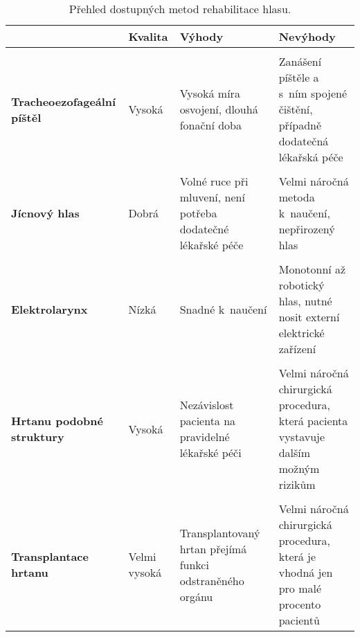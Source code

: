 
\newcolumntype{b}{X}

\begin{table}[ht]
  \centering
  \begin{tabularx}{1.0\textwidth}{L{1.2} L{0.6} L{1.1} L{1.1}}
    & \textbf{Kvalita} & \textbf{Výhody} & \textbf{Nevýhody} \\
    \toprule \\ [-1.75ex]

    \textbf{Tracheoezofageální píštěl} & Vysoká & Vysoká míra osvojení, dlouhá fonační doba & Zanášení píštěle a s~ním spojené čištění, případně dodatečná lékařská péče \\
    \midrule \\ [-1.75ex]

    \textbf{Jícnový hlas} & Dobrá & Volné ruce při mluvení, není potřeba dodatečné lékařské péče & Velmi náročná metoda  k~naučení, nepřirozený hlas \\
    \midrule \\ [-1.75ex]

    \textbf{Elektrolarynx} & Nízká & Snadné  k~naučení & Monotonní až robotický hlas, nutné nosit externí elektrické zařízení \\
    \midrule \\ [-1.75ex]

    \textbf{Hrtanu podobné struktury} & Vysoká & Nezávislost pacienta na pravidelné lékařské péči & Velmi náročná chirurgická procedura, která pacienta vystavuje dalším možným rizikům  \\
    \midrule \\ [-1.75ex]

    \textbf{Transplantace hrtanu} & Velmi vysoká & Transplantovaný hrtan přejímá funkci odstraněného orgánu & Velmi náročná chirurgická procedura, která je vhodná jen pro malé procento pacientů \\
  \end{tabularx}

  \caption{Přehled dostupných metod rehabilitace hlasu. \label{tab:treatment:summary}}
\end{table}

